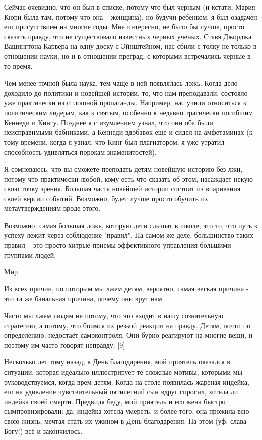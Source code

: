 \documentclass[ebook,12pt,oneside,openany]{memoir}
\begin{document}
Сейчас очевидно, что он был в списке, потому что был черным (и кстати,
Мария Кюри была там, потому что она -- женщина), но будучи ребенком, я
был озадачен его присутствием на многие годы. Мне интересно, не было
бы лучше, просто сказать правду, что не существовало известных черных
ученых. Ставя Джорджа Вашингтона Карвера на одну доску с Эйнштейном,
нас сбили с толку не только в отношении науки, но и в отношении
преград, с которыми встречались черные в то время.

Чем менее точной была наука, тем чаще в ней появлялась ложь. Когда
дело доходило до политики и новейшей истории, то, что нам преподавали,
состояло уже практически из сплошной пропаганды. Например, нас учили
относиться к политическим лидерам, как к святым, особенно к недавно
трагически погибшим Кеннеди и Кингу. Позднее я с изумлением узнал, что
они оба были неисправимыми бабниками, а Кеннеди вдобавок еще и сидел
на амфетаминах (к тому времени, когда я узнал, что Кинг был
плагиатором, я уже утратил способность удивляться порокам
знаменитостей).

Я сомневаюсь, что вы сможете преподать детям новейшую историю без лжи,
потому что практически любой, кому есть что сказать об этом, насаждает
некую свою точку зрения. Большая часть новейшей истории состоит из
впаривания своей версии событий. Возможно, будет лучше просто обучить
их метаутверждениям вроде этого.

Возможно, самая большая ложь, которую дети слышат в школе, это то, что
путь к успеху лежит через соблюдение "правил". На самом же деле,
большинство таких правил -- это просто хитрые приемы эффективного
управления большими группами людей.

Мир

Из всех причин, по поторым мы лжем детям, вероятно, самая веская
причина - это та же банальная причина, почему они врут нам.

Часто мы лжем людям не потому, что это входит в нашу сознательную
стратегию, а потому, что боимся их резкой реакции на правду. Детям,
почти по определению, недостаёт самоконтроля. Они бурно реагируют на
многие вещи, и поэтому им часто говорят неправду. [9]

Несколько лет тому назад, в День благодарения, мой приятель оказался в
ситуации, которая идеально иллюстрирует те сложные мотивы, которыми мы
руководствуемся, когда врем детям. Когда на столе появилась жареная
индейка, его на удивление чувствительный пятилетний сын вдруг спросил,
хотела ли индейка своей смерти. Предвидя беду, мой приятель и его жена
быстро сымпровизировали: да, индейка хотела умереть, и более того, она
прожила всю свою жизнь, мечтая стать их ужином в День благодарения. На
этом (уф, слава Богу!) всё и закончилось.
\end{document}
